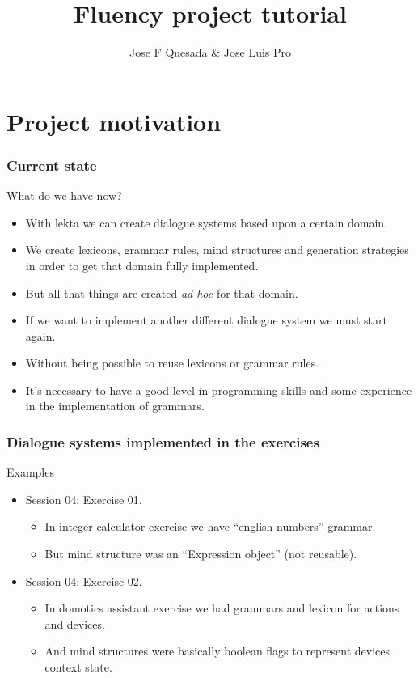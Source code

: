 \documentclass[11pt]{beamer}
\title[Fluency project tutorial]{Fluency project tutorial}
\author{Jose F Quesada \& Jose Luis Pro}
\date{}
\begin{document}
\begin{frame}
\titlepage
\end{frame}

\section{Project motivation}

\begin{frame}
\frametitle{Current state}
	\begin{block}{What do we have now?}
			\begin{itemize}
				\item With lekta we can create dialogue systems based upon a certain domain.
				\item We create lexicons, grammar rules, mind structures and generation strategies in order to get that domain fully implemented.
				\item But all that things are created \emph{ad-hoc} for that domain.
				\item If we want to implement another different dialogue system we must start again.
				\item Without being possible to reuse lexicons or grammar rules.
				\item It's necessary to have a good level in programming skills and some experience in the implementation of grammars.
			\end{itemize}
	\end{block}
\end{frame}

\begin{frame}
\frametitle{Dialogue systems implemented in the exercises}
	\begin{block}{Examples}
			\begin{itemize}
				\item Session 04: Exercise 01.
				\begin{itemize}
					\item In integer calculator exercise we have ``english numbers'' grammar. 
					\item But mind structure was an ``Expression object'' (not reusable).
				\end{itemize}
				\vspace{15pt}
				\pause
				\item Session 04: Exercise 02.	
				\begin{itemize}
					\item In domotics assistant exercise we had grammars and lexicon for actions and devices. 
					\item And mind structures were basically boolean flags to represent devices context state.
				\end{itemize}
			\end{itemize}
	\end{block}
\end{frame}
\end{document}
